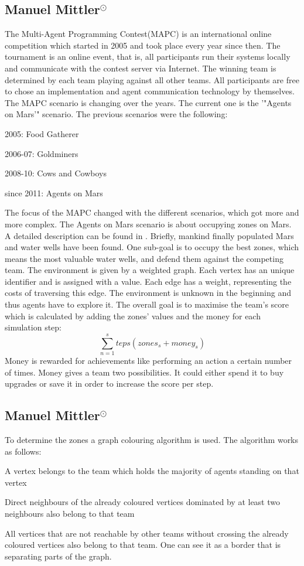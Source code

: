 \subsection[Multi Agent Programming Contest]{Manuel Mittler$^{\odot}$}
The Multi-Agent Programming Contest(MAPC) is an international online competition which started in 2005 and took place every year since then. The tournament is an online event, that is, all participants run their systems locally and communicate with the contest server via Internet. The winning team is determined by each team playing against all other teams. All participants are free to chose an implementation and agent communication technology by themselves. The MAPC scenario is changing over the years. The current one is the ’"Agents on Mars’" scenario. The previous scenarios were the following:
\begin{description}
	\item 2005: Food Gatherer
	\item 2006-07: Goldminers
	\item 2008-10: Cows and Cowboys
	\item since 2011: Agents on Mars
\end{description}
The focus of the MAPC changed with the different scenarios, which got more and more complex. The Agents on Mars scenario is about occupying zones on Mars. A detailed description can be found in \cite{MAPC}. Briefly, mankind finally populated Mars and water wells have been found. One sub-goal is to occupy the best zones, which means the most valuable water wells, and defend them against the competing team. The environment is given by a weighted graph. Each vertex has an unique identiﬁer and is assigned with a value. Each edge has a weight, representing the costs of traversing this edge. The environment is unknown in the beginning and thus agents have to explore it. The overall goal is to maximise the team's score which is calculated by adding the zones' values and the money for each simulation step:
\begin{equation}
	\sum_{n=1}^steps (zones_s + money_s)
\end{equation}
Money is rewarded for achievements like performing an action a certain number of times. Money gives a team two possibilities. It could either spend it to buy upgrades or save it in order to increase the score per step.
\subsection[Zones]{Manuel Mittler$^{\odot}$}
To determine the zones a graph colouring algorithm is used. The algorithm works as follows:
\begin{description}
	\item A vertex belongs to the team which holds the majority of agents standing on that vertex
	\item Direct neighbours of the already coloured vertices dominated by at least two neighbours also belong to that team
	\item All vertices that are not reachable by other teams without crossing the already coloured vertices also belong to that team. One can see it as a border that	is separating parts of the graph.
\end{description}